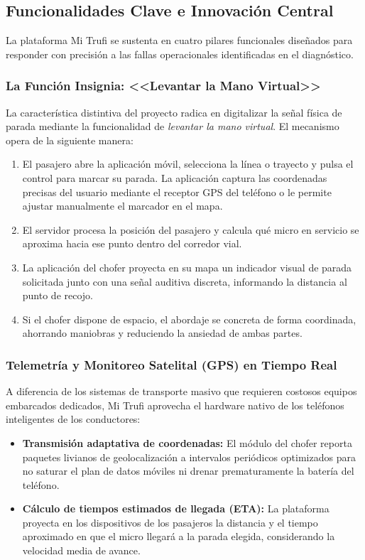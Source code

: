 \subsection{Funcionalidades Clave e Innovación Central}

La plataforma Mi Trufi se sustenta en cuatro pilares funcionales diseñados para responder con precisión a las fallas operacionales identificadas en el diagnóstico.

\subsubsection{La Función Insignia: <<Levantar la Mano Virtual>>}

La característica distintiva del proyecto radica en digitalizar la señal física de parada mediante la funcionalidad de \emph{levantar la mano virtual}. El mecanismo opera de la siguiente manera:

\begin{enumerate}[label=\arabic*.]
    \item El pasajero abre la aplicación móvil, selecciona la línea o trayecto y pulsa el control para marcar su parada. La aplicación captura las coordenadas precisas del usuario mediante el receptor GPS del teléfono o le permite ajustar manualmente el marcador en el mapa.
    \item El servidor procesa la posición del pasajero y calcula qué micro en servicio se aproxima hacia ese punto dentro del corredor vial.
    \item La aplicación del chofer proyecta en su mapa un indicador visual de parada solicitada junto con una señal auditiva discreta, informando la distancia al punto de recojo.
    \item Si el chofer dispone de espacio, el abordaje se concreta de forma coordinada, ahorrando maniobras y reduciendo la ansiedad de ambas partes.
\end{enumerate}

\subsubsection{Telemetría y Monitoreo Satelital (GPS) en Tiempo Real}

A diferencia de los sistemas de transporte masivo que requieren costosos equipos embarcados dedicados, Mi Trufi aprovecha el hardware nativo de los teléfonos inteligentes de los conductores:

\begin{itemize}
    \item \textbf{Transmisión adaptativa de coordenadas:} El módulo del chofer reporta paquetes livianos de geolocalización a intervalos periódicos optimizados para no saturar el plan de datos móviles ni drenar prematuramente la batería del teléfono.
    \item \textbf{Cálculo de tiempos estimados de llegada (ETA):} La plataforma proyecta en los dispositivos de los pasajeros la distancia y el tiempo aproximado en que el micro llegará a la parada elegida, considerando la velocidad media de avance.
\end{itemize}

